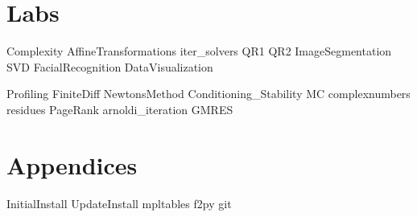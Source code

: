 \documentclass[nociteref]{SIAM-GH-book}
\begin{document}
\part{Labs} %
{Complexity}
{AffineTransformations}
{iter_solvers}
{QR1}
{QR2}
{ImageSegmentation}
{SVD}
{FacialRecognition}
{DataVisualization}

{Profiling}
{FiniteDiff}
{NewtonsMethod}
{Conditioning_Stability}
{MC}
{complexnumbers}
{residues}
{PageRank}
{arnoldi_iteration}
{GMRES}


\part{Appendices} %
\begin{appendices}
{InitialInstall}
{UpdateInstall}
{mpltables}
{f2py}
{git}
\end{appendices}
\end{document}
